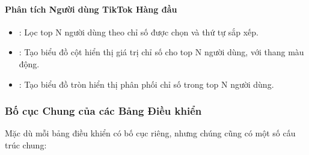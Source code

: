 \paragraph{Phân tích Người dùng TikTok Hàng đầu}
\begin{itemize}
    \item {}: Lọc top N người dùng theo chỉ số được chọn và thứ tự sắp xếp.

    \item {}: Tạo biểu đồ cột hiển thị giá trị chỉ số cho top N người dùng, với thang màu động.
    
    \item {}: Tạo biểu đồ tròn hiển thị phân phối chỉ số trong top N người dùng.
\end{itemize}

\subsubsection{Bố cục Chung của các Bảng Điều khiển}

\noindent
Mặc dù mỗi bảng điều khiển có bố cục riêng, nhưng chúng cũng có một số cấu trúc chung:

